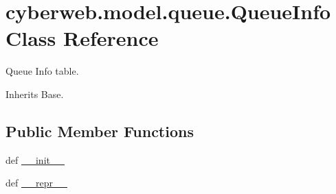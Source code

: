 \hypertarget{classcyberweb_1_1model_1_1queue_1_1_queue_info}{\section{cyberweb.\-model.\-queue.\-Queue\-Info \-Class \-Reference}
\label{classcyberweb_1_1model_1_1queue_1_1_queue_info}
}


\-Queue \-Info table.  




\-Inherits \-Base.

\subsection*{\-Public \-Member \-Functions}
\begin{DoxyCompactItemize}
\item 
def \hyperlink{classcyberweb_1_1model_1_1queue_1_1_queue_info_acf31b22ba340350f502e095fcbcdfdf4}{\-\_\-\-\_\-init\-\_\-\-\_\-}
\item 
def \hyperlink{classcyberweb_1_1model_1_1queue_1_1_queue_info_a2d229286177877ab3b1de5d7e5a7606c}{\-\_\-\-\_\-repr\-\_\-\-\_\-}
\end{DoxyCompactItemize}

